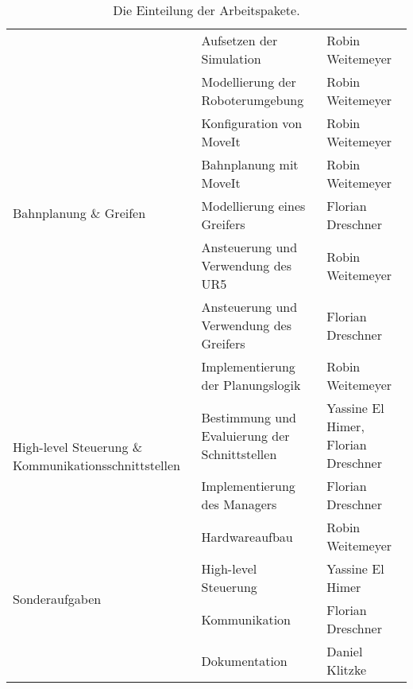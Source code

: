 \begin{table}[H]
{\begin{tabular}{|p{7cm}|p{7cm}|p{7cm}|}
\multirow{8}{7cm}{Bahnplanung \& Greifen}                               & Aufsetzen der Simulation                                    & Robin Weitemeyer                    \\ \cline{2-3} 
                                                                      & Modellierung der Roboterumgebung                            & Robin Weitemeyer                    \\ \cline{2-3} 
                                                                      & Konfiguration von MoveIt                                    & Robin Weitemeyer                    \\ \cline{2-3} 
                                                                      & Bahnplanung mit MoveIt                                      & Robin Weitemeyer                    \\ \cline{2-3} 
                                                                      & Modellierung eines Greifers                                 & Florian Dreschner                   \\ \cline{2-3} 
                                                                      & Ansteuerung und Verwendung des UR5                          & Robin Weitemeyer                    \\ \cline{2-3} 
                                                                      & Ansteuerung und Verwendung des Greifers                     & Florian Dreschner                   \\ \cline{2-3} 
                                                                      & Implementierung der Planungslogik                           & Robin Weitemeyer                    \\ \hline
\multirow{2}{7cm}{High-level Steuerung \& Kommunikationsschnittstellen} & Bestimmung und Evaluierung der Schnittstellen               & Yassine El Himer, Florian Dreschner \\ \cline{2-3} 
                                                                      & Implementierung des Managers                                & Florian Dreschner                   \\ \hline
\multirow{4}{7cm}{Sonderaufgaben}                                       & Hardwareaufbau                                              & Robin Weitemeyer                    \\ \cline{2-3} 
                                                                      & High-level Steuerung                                        & Yassine El Himer                    \\ \cline{2-3} 
                                                                      & Kommunikation                                               & Florian Dreschner                   \\ \cline{2-3} 
                                                                      & Dokumentation                                               & Daniel Klitzke                      \\ \hline
 \end{tabular}
}
 \caption{Die Einteilung der Arbeitspakete.}
 \label{tab:work-packages}
\end{table}